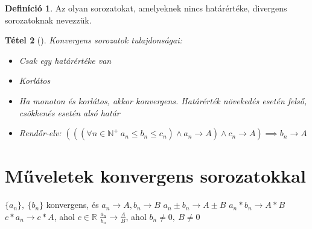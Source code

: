 \documentclass[twoside,12pt]{report}
\newtheorem{theorem}{Tétel}[section]
\theoremstyle{definition}
\newtheorem{definition}[theorem]{Definíció}
\begin{document}
	\begin{definition}
		Az olyan sorozatokat, amelyeknek nincs határértéke, divergens sorozatoknak nevezzük.
	\end{definition}
	\begin{theorem}[]
		Konvergens sorozatok tulajdonságai:
		\begin{itemize}
			\item Csak egy határértéke van
			\item Korlátos
			\item Ha monoton és korlátos, akkor konvergens. Határérték növekedés esetén felső, csökkenés esetén alsó határ
			\item Rendőr-elv: $\left(\left(\left(\forall n\in\mathbb{N}^+\ a_n\le b_n\le c_n\right)\wedge a_n\rightarrow A\right)\wedge c_n\rightarrow A\right)\implies b_n\rightarrow A$
		\end{itemize}
	\end{theorem}
\section{Műveletek konvergens sorozatokkal}
	\begin{outline}
		\1 $\{a_n\},\ \{b_n\}$ konvergens, és $a_n\rightarrow A, b_n\rightarrow B$
			\2 $a_n\pm b_n\rightarrow A\pm B$
			\2 $a_n*b_n\rightarrow A*B$
			\2 $c*a_n\rightarrow c*A$, ahol $c\in\mathbb{R}$
			\2 $\frac{a_n}{b_n}\rightarrow\frac{A}{B}$, ahol $b_n\ne0,\ B\ne0$
	\end{outline}
\end{document}
